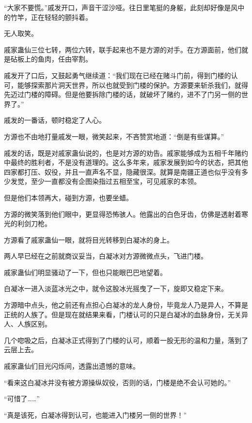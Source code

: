 
\begin{this_body}



“大家不要慌。”戚发开口，声音干涩沙哑。往日里笔挺的身躯，此刻却好像是风中的竹竿，正在轻轻的颤抖着。

无人取笑。

戚家蛊仙三位七转，两位六转，联手起来也不是方源的对手。在方源面前，他们就是砧板上的鱼肉，任由宰割。

戚发开了口后，又鼓起勇气继续道：“我们现在已经在赌斗门前，得到门楼的认可，能够探索那片洞天世界，所以也就受到门楼的保护。方源要来斩杀我们，就得先迈过门楼的障碍。但是他要拆除门楼的话，就破坏了赌约，进不了门另一侧的世界了。”

戚发的一番话，顿时稳定了人心。

方源也不由地打量戚发一眼，微笑起来，不吝赞赏地道：“倒是有些谋算。”

戚发的话，既是对戚家蛊仙说的，也是对方源的劝告。戚家能够成为五相千年赌约中最终的胜利者，不是没有道理的。这么多年来，戚家发展到如今的状态，把其他四家都打压、奴役，并且一直声名不显，隐藏很深。就算是南疆正道也似乎没有多少发觉，至少一直都没有企图染指过五相至宝，可见戚家的本领。

但是他们本领再大，碰到方源，也要坐蜡。

方源的微笑落到他们眼中，更显得恐怖骇人。他露出的白色牙齿，仿佛是透射着寒光的利剑刀枪。

方源看了戚家蛊仙一眼，就将目光转移到白凝冰的身上。

两人早已经在之前就商议妥当，白凝冰对方源微微点头，飞进门楼。

戚家蛊仙们明显骚动了一下，但也只能眼巴巴地望着。

白凝冰一进入淡蓝冰光之中，就令这股冰光摇曳了一下，旋即又稳定下来。

方源暗中点头，他之前还有点担心白凝冰的龙人身份，毕竟龙人乃是异人，不算是正统的人族了。但是现在就结果来看，门楼认可的只是白凝冰的血脉身份，无关异人、人族区别。

几个唿吸之后，白凝冰正式得到了门楼的认可，顺着一股无形的温和力量，落到了云层上去。

戚家蛊仙们目光闪烁间，透露出遗憾的意味。

“看来这白凝冰并没有被方源操纵奴役，否则的话，门楼是绝不会认可她的。”

“可惜了……”

“真是该死，白凝冰得到认可，也能进入门楼另一侧的世界！”


\end{this_body}
